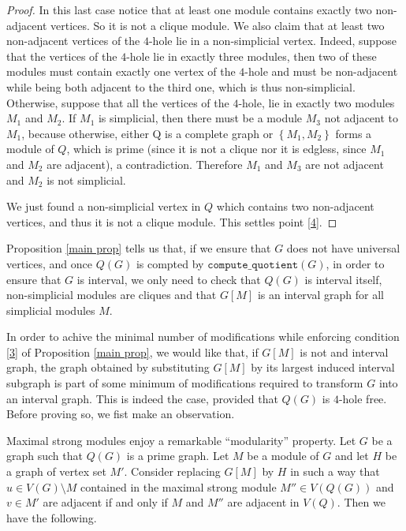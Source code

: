 \documentclass{article}
\begin{document}
\begin{proof}
        In this last case notice that at least one module
        contains exactly two non-adjacent vertices.
        So it is not a clique module.
        We also claim that at least two non-adjacent
        vertices of the $4$-hole lie in a non-simplicial vertex.
        Indeed, suppose that the vertices of the $4$-hole
        lie in exactly three modules, then two of these
        modules must contain
        exactly one vertex of the $4$-hole
        and must be non-adjacent
        while being both adjacent to the
        third one, which is thus non-simplicial. 
        Otherwise, suppose that all the vertices of the $4$-hole, 
        lie in exactly two modules $M_1$ and $M_2$.
        If $M_1$ is simplicial, then there must be a module $M_3$
        not adjacent to $M_1$, because otherwise, either Q is a
        complete graph or $\left\{M_1, M_2\right\}$ forms a module
        of $Q$, which is prime (since it is not a clique
        nor it is edgless, since $M_1$ and $M_2$ are
        adjacent),
        a contradiction. 
        Therefore $M_1$ and $M_3$ are not adjacent and
        $M_2$ is not simplicial.
        
        We just found a non-simplicial vertex in $Q$
        which contains two non-adjacent vertices, and thus
        it is not a clique module. This settles point \ref{4}.
    \end{proof}
 
    Proposition \ref{main prop} tells us that,
    if we ensure that
    $G$ does not have universal
    vertices, and
    once $Q\left(G\right)$ is
    compted by $\texttt{compute\_quotient}\left(G\right)$,
    in order to ensure that
    $G$ is interval,
    we only need to check that 
    $Q\left(G\right)$ is interval
    itself,
    non-simplicial modules are cliques and
    that $G\left[M\right]$ is
    an interval graph for all simplicial
    modules $M$.

    In order to
    achive the minimal 
    number of modifications
    while enforcing
    condition \ref{3}
    of Proposition \ref{main prop},
    we would like that,
    if $G\left[M\right]$ is not
    and interval graph, the
    graph obtained by substituting
    $G\left[M\right]$ by its
    largest induced interval subgraph
    is part of some minimum
    of modifications required to
    transform $G$ into an
    interval graph.
    This is indeed the case,
    provided that $Q\left(G\right)$
    is $4$-hole free.
    Before proving so,
    we fist make an observation.

    Maximal strong modules
    enjoy a remarkable ``modularity''
    property.
    Let $G$ be a graph such
    that $Q\left(G\right)$ is
    a prime graph. Let $M$ be
    a module of $G$ and let
    $H$ be a graph of
    vertex set $M'$.
    Consider replacing $G\left[M\right]$ 
    by $H$ in such a way 
    that $u \in V \left(G\right) \setminus M$
    contained in the maximal
    strong module $M'' \in V\left(Q\left(G\right)\right)$
    and $v \in M'$ are
    adjacent if and only if
    $M$ and $M''$ are adjacent
    in $V\left(Q\right)$.
    Then we have the following.
    
\end{document}
